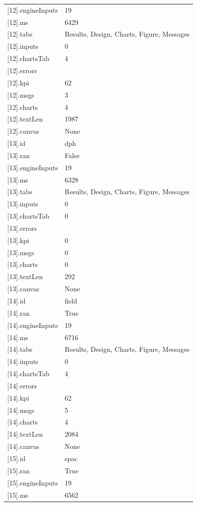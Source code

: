 {\begin{longtable}{p{}p{}}
{}[12].engineInputs & 19\\
{}[12].ms & 6429\\
{}[12].tabs & Results, Design, Charts, Figure, Messages\\
{}[12].inputs & 0\\
{}[12].chartsTab & 4\\
{}[12].errors & \\
{}[12].kpi & 62\\
{}[12].msgs & 3\\
{}[12].charts & 4\\
{}[12].textLen & 1987\\
{}[12].canvas & None\\
{}[13].id & dph\\
{}[13].ran & False\\
{}[13].engineInputs & 19\\
{}[13].ms & 6328\\
{}[13].tabs & Results, Design, Charts, Figure, Messages\\
{}[13].inputs & 0\\
{}[13].chartsTab & 0\\
{}[13].errors & \\
{}[13].kpi & 0\\
{}[13].msgs & 0\\
{}[13].charts & 0\\
{}[13].textLen & 292\\
{}[13].canvas & None\\
{}[14].id & field\\
{}[14].ran & True\\
{}[14].engineInputs & 19\\
{}[14].ms & 6716\\
{}[14].tabs & Results, Design, Charts, Figure, Messages\\
{}[14].inputs & 0\\
{}[14].chartsTab & 4\\
{}[14].errors & \\
{}[14].kpi & 62\\
{}[14].msgs & 5\\
{}[14].charts & 4\\
{}[14].textLen & 2084\\
{}[14].canvas & None\\
{}[15].id & spac\\
{}[15].ran & True\\
{}[15].engineInputs & 19\\
{}[15].ms & 6562\\

\end{longtable}}
